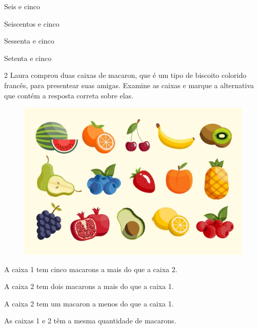 \begin{minipage}{.5\textwidth}
\begin{escolha}
\item Seis e cinco

\item Seiscentos e cinco

\item Sessenta e cinco

\item Setenta e cinco
\end{escolha}
\end{minipage}

\num{2} Laura comprou duas caixas de macaron, que é um tipo de biscoito colorido
francês, para presentear suas amigas. Examine as caixas e marque a
alternativa que contém a resposta correta sobre elas.

\begin{figure}[htpb!]
\includegraphics[width=\textwidth]{./media/image152.png}
\end{figure}

\begin{escolha}
\item A caixa 1 tem cinco macarons a mais do que a caixa 2.

\item A caixa 2 tem dois macarons a mais do que a caixa 1.

\item A caixa 2 tem um macaron a menos do que a caixa 1.

\item As caixas 1 e 2 têm a mesma quantidade de macarons.
\end{escolha}

